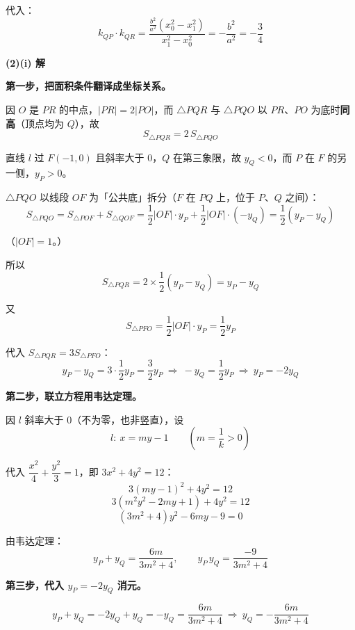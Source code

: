 \begin{answer}
代入：
\nopagebreak[4]
\[k_{QP}\cdot k_{QR}=\frac{\frac{b^2}{a^2}\left(x_0^2-x_1^2\right)}{x_1^2-x_0^2}=-\frac{b^2}{a^2}=-\frac34\]

\par\medskip

\textbf{(2)(i) 解}

\textbf{第一步，把面积条件翻译成坐标关系。}

因 $O$ 是 $PR$ 的中点，$|PR|=2|PO|$，而 $\triangle PQR$ 与 $\triangle PQO$ 以 $PR$、$PO$ 为底时\textbf{同高}（顶点均为 $Q$），故
\nopagebreak[4]
\[S_{\triangle PQR}=2\,S_{\triangle PQO}\]

直线 $l$ 过 $F(-1,0)$ 且斜率大于 $0$，$Q$ 在第三象限，故 $y_Q<0$，而 $P$ 在 $F$ 的另一侧，$y_P>0$。

$\triangle PQO$ 以线段 $OF$ 为「公共底」拆分（$F$ 在 $PQ$ 上，位于 $P$、$Q$ 之间）：
\nopagebreak[4]
\[S_{\triangle PQO}=S_{\triangle POF}+S_{\triangle QOF}=\frac12|OF|\cdot y_P+\frac12|OF|\cdot\left(-y_Q\right)=\frac12\left(y_P-y_Q\right)\]

（$|OF|=1$。）

所以
\nopagebreak[4]
\[S_{\triangle PQR}=2\times\frac12\left(y_P-y_Q\right)=y_P-y_Q\]

又
\nopagebreak[4]
\[S_{\triangle PFO}=\frac12|OF|\cdot y_P=\frac12 y_P\]

代入 $S_{\triangle PQR}=3S_{\triangle PFO}$：
\nopagebreak[4]
\[y_P-y_Q=3\cdot\frac12 y_P=\frac32 y_P\ \Longrightarrow\ -y_Q=\frac12 y_P\ \Longrightarrow\ \boxed{y_P=-2y_Q}\]

\textbf{第二步，联立方程用韦达定理。}

因 $l$ 斜率大于 $0$（不为零，也非竖直），设
\nopagebreak[4]
\[l:\ x=my-1\qquad\left(m=\frac1k>0\right)\]

代入 $\dfrac{x^2}{4}+\dfrac{y^2}{3}=1$，即 $3x^2+4y^2=12$：
\nopagebreak[4]
\[3(my-1)^2+4y^2=12\]
\nopagebreak[4]
\[3\left(m^2y^2-2my+1\right)+4y^2=12\]
\nopagebreak[4]
\[\left(3m^2+4\right)y^2-6my-9=0\]

由韦达定理：
\nopagebreak[4]
\[y_P+y_Q=\frac{6m}{3m^2+4},\qquad y_P\,y_Q=\frac{-9}{3m^2+4}\]

\textbf{第三步，代入 $y_P=-2y_Q$ 消元。}

\nopagebreak[4]
\[y_P+y_Q=-2y_Q+y_Q=-y_Q=\frac{6m}{3m^2+4}\ \Longrightarrow\ y_Q=-\frac{6m}{3m^2+4}\]


\end{answer}
